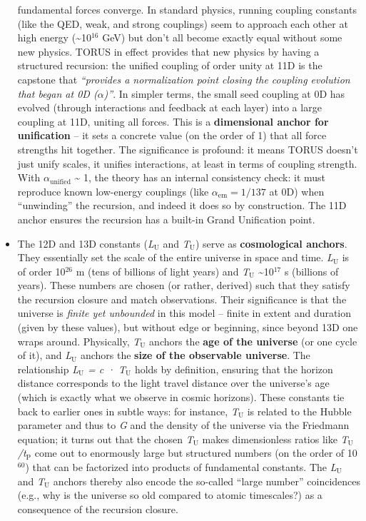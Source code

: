 \documentclass[]{article}
\newcommand{\subscript}[1]{\ensuremath{_{\mathrm{#1}}}}
\newcommand{\superscript}[1]{\ensuremath{^{\mathrm{#1}}}}
\begin{document}
\begin{itemize}
  fundamental forces converge. In standard physics, running coupling
  constants (like the QED, weak, and strong couplings) seem to approach
  each other at high energy (\textasciitilde{}10\superscript{16} GeV) but don't
  all become exactly equal without some new physics. TORUS in effect
  provides that new physics by having a structured recursion: the
  unified coupling of order unity at 11D is the capstone that
  \emph{``provides a normalization point closing the coupling evolution
  that began at 0D ($\alpha$)''}​. In simpler terms, the small seed coupling at
  0D has evolved (through interactions and feedback at each layer) into
  a large coupling at 11D, uniting all forces. This is a
  \textbf{dimensional anchor for unification} -- it sets a concrete
  value (on the order of 1) that all force strengths hit together. The
  significance is profound: it means TORUS doesn't just unify scales, it
  unifies interactions, at least in terms of coupling strength. With
  $\alpha_\text{unified}$
  \textasciitilde{} 1, the theory has an internal consistency check: it
  must reproduce known low-energy couplings (like $\alpha_\text{em} = 1/137$ at 0D)
  when ``unwinding'' the recursion, and indeed it does so by
  construction. The 11D anchor ensures the recursion has a built-in
  Grand Unification point.
\item
  The 12D and 13D constants
  (\emph{L\subscript{U}}
  and
  \emph{T\subscript{U}})
  serve as \textbf{cosmological anchors}. They essentially set the scale
  of the entire universe in space and time.
  \emph{L\subscript{U}} is
  of order 10\superscript{26} m (tens of billions of light years) and
  \emph{T\subscript{U}}
  \textasciitilde{}10\superscript{17} s (billions of years). These numbers are
  chosen (or rather, derived) such that they satisfy the recursion
  closure and match observations. Their significance is that the
  universe is \emph{finite yet unbounded} in this model -- finite in
  extent and duration (given by these values), but without edge or
  beginning, since beyond 13D one wraps around. Physically,
  \emph{T\subscript{U}}
  anchors the \textbf{age of the universe} (or one cycle of it), and
  \emph{L\subscript{U}}
  anchors the \textbf{size of the observable universe}. The relationship
  \emph{L\subscript{U} = c
  · T\subscript{U}} holds
  by definition​, ensuring that the horizon distance corresponds to the
  light travel distance over the universe's age (which is exactly what
  we observe in cosmic horizons). These constants tie back to earlier
  ones in subtle ways: for instance,
  \emph{T\subscript{U}}
  is related to the Hubble parameter and thus to \emph{G} and the density
  of the universe via the Friedmann equation​; it turns out that the
  chosen
  \emph{T\subscript{U}}
  makes dimensionless ratios like
  \emph{T\subscript{U}/t\subscript{P}}
  come out to enormously large but structured numbers (on the order of
  10\superscript{60}) that can be factorized into products of fundamental
  constants. The
  \emph{L\subscript{U}}
  and
  \emph{T\subscript{U}}
  anchors thereby also encode the so-called ``large number''
  coincidences (e.g., why is the universe so old compared to atomic
  timescales?) as a consequence of the recursion closure.
\end{itemize}
\end{document}
